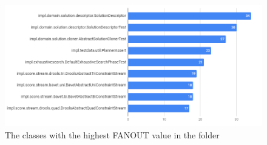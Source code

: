 \begin{itemize}
        \begin{figure}[H]
            \centering
            \includegraphics[scale=0.8]{figures/step4/step4.2/FANOUT_impl.PNG}
            \caption{The classes with the highest FANOUT value in the  folder}
            \label{fig:fanoutimpl}
        \end{figure}
    \end{itemize}
